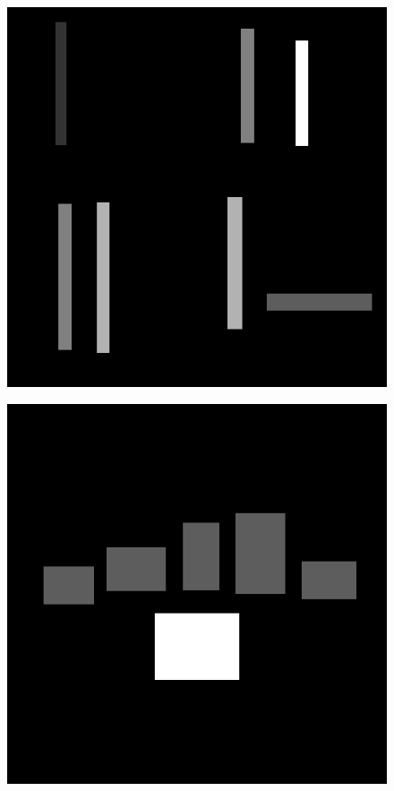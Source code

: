\documentclass[12pt]{article}
\begin{document}
    \begin{figure}[h!]
    \centering
    \includegraphics[width=14cm]{sample2}
    \end{figure}
    \newpage

    \begin{figure}[h!]
    \centering
    \includegraphics[width=14cm]{sample3}
    \end{figure}
    \newpage
\end{document}
